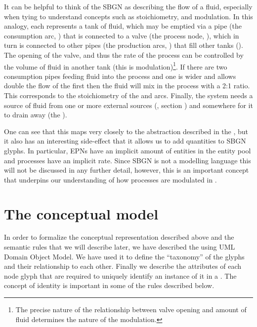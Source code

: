 It can be helpful to think of the SBGN \PD as describing the flow of a fluid, especially when tying to understand concepts such as stoichiometry, and modulation. In this analogy, each  represents a tank of fluid, which may be emptied via a pipe (the consumption arc, ) that is connected to a valve (the process node, ), which in turn is connected to other pipes (the production arcs, ) that fill other tanks (). The opening of the valve, and thus the rate of the process can be controlled by the volume of fluid in another tank (this is modulation)\footnote{The precise nature of the relationship between valve opening and amount of fluid determines the nature of the modulation.}. If there are two consumption pipes feeding fluid into the process and one is wider and allows double the flow of the first then the fluid will mix in the process with a 2:1 ratio. This corresponds to the stoichiometry of the  and  arcs. Finally, the system needs a source of fluid from one or more external sources (, section ) and somewhere for it to drain away (the ).

One can see that this maps very closely to the abstraction described in the \PDl, but it also has an interesting side-effect that it allows us to add quantities to SBGN glyphs. In particular, EPNs have an implicit amount of entities in the entity pool and processes have an implicit rate. Since SBGN \PD is not a modelling language this will not be discussed in any further detail, however, this is an important concept that underpins our understanding of how processes are modulated in .

\section{The conceptual model}
\label{sec:conceptual-model}

In order to formalize the conceptual representation described above and the semantic rules that we will describe later, we have described the \PDl using UML Domain Object Model. We have used it to define the ``taxonomy'' of the \PD glyphs and their relationship to each other. Finally we describe the attributes of each node glyph that are required to uniquely identify an instance of it in a \PDm. The concept of identity is important in some of the rules described below.

